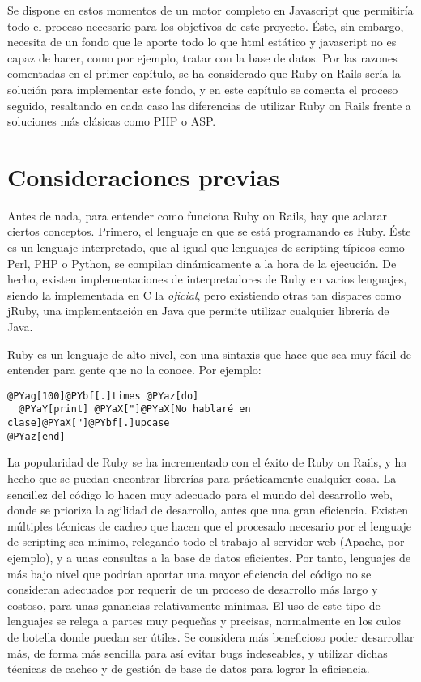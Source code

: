 Se dispone en estos momentos de un motor completo en Javascript que permitiría todo el proceso necesario para los objetivos de este proyecto. Éste, sin embargo, necesita de un fondo que le aporte todo lo que html estático y javascript no es capaz de hacer, como por ejemplo, tratar con la base de datos. Por las razones comentadas en el primer capítulo, se ha considerado que Ruby on Rails sería la solución para implementar este fondo, y en este capítulo se comenta el proceso seguido, resaltando en cada caso las diferencias de utilizar Ruby on Rails frente a soluciones más clásicas como PHP o ASP.

\section{Consideraciones previas} %
\label{sec:ruby_on_rails_consideraciones_previas}
Antes de nada, para entender como funciona Ruby on Rails, hay que aclarar ciertos conceptos. Primero, el lenguaje en que se está programando es Ruby. Éste es un lenguaje interpretado, que al igual que lenguajes de scripting típicos como Perl, PHP o Python, se compilan dinámicamente a la hora de la ejecución. De hecho, existen implementaciones de interpretadores de Ruby en varios lenguajes, siendo la implementada en C la \emph{oficial}, pero existiendo otras tan dispares como jRuby, una implementación en Java que permite utilizar cualquier librería de Java.

Ruby es un lenguaje de alto nivel, con una sintaxis que hace que sea muy fácil de entender para gente que no la conoce. Por ejemplo:

\begin{Verbatim}[commandchars=@\[\]]
@PYag[100]@PYbf[.]times @PYaz[do] 
  @PYaY[print] @PYaX["]@PYaX[No hablaré en clase]@PYaX["]@PYbf[.]upcase
@PYaz[end]  
\end{Verbatim}


La popularidad de Ruby se ha incrementado con el éxito de Ruby on Rails, y ha hecho que se puedan encontrar librerías para prácticamente cualquier cosa. La sencillez del código lo hacen muy adecuado para el mundo del desarrollo web, donde se prioriza la agilidad de desarrollo, antes que una gran eficiencia. Existen múltiples técnicas de cacheo que hacen que el procesado necesario por el lenguaje de scripting sea mínimo, relegando todo el trabajo al servidor web (Apache, por ejemplo), y a unas consultas a la base de datos eficientes. Por tanto, lenguajes de más bajo nivel que podrían aportar una mayor eficiencia del código no se consideran adecuados por requerir de un proceso de desarrollo más largo y costoso, para unas ganancias relativamente mínimas. El uso de este tipo de lenguajes se relega a partes muy pequeñas y precisas, normalmente en los culos de botella donde puedan ser útiles. Se considera más beneficioso poder desarrollar más, de forma más sencilla para así evitar bugs indeseables, y utilizar dichas técnicas de cacheo y de gestión de base de datos para lograr la eficiencia.

